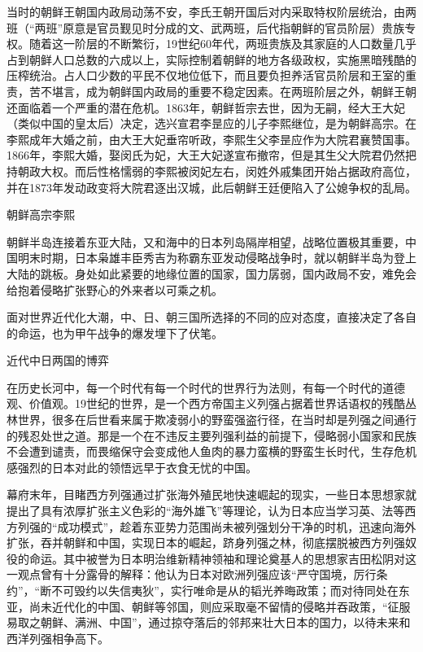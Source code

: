 \documentclass[12pt,UTF8]{ctexbook}
\begin{document}
当时的朝鲜王朝国内政局动荡不安，李氏王朝开国后对内采取特权阶层统治，由两班（“两班”原意是官员觐见时分成的文、武两班，后代指朝鲜的官员阶层）贵族专权。随着这一阶层的不断繁衍，19世纪60年代，两班贵族及其家庭的人口数量几乎占到朝鲜人口总数的六成以上，实际控制着朝鲜的地方各级政权，实施黑暗残酷的压榨统治。占人口少数的平民不仅地位低下，而且要负担养活官员阶层和王室的重责，苦不堪言，成为朝鲜国内政局的重要不稳定因素。在两班阶层之外，朝鲜王朝还面临着一个严重的潜在危机。1863年，朝鲜哲宗去世，因为无嗣，经大王大妃（类似中国的皇太后）决定，选兴宣君李昰应的儿子李熙继位，是为朝鲜高宗。在李熙成年大婚之前，由大王大妃垂帘听政，李熙生父李昰应作为大院君襄赞国事。1866年，李熙大婚，娶闵氏为妃，大王大妃遂宣布撤帘，但是其生父大院君仍然把持朝政大权。而后性格懦弱的李熙被闵妃左右，闵姓外戚集团开始占据政府高位，并在1873年发动政变将大院君逐出汉城，此后朝鲜王廷便陷入了公媳争权的乱局。


朝鲜高宗李熙

朝鲜半岛连接着东亚大陆，又和海中的日本列岛隔岸相望，战略位置极其重要，中国明末时期，日本枭雄丰臣秀吉为称霸东亚发动侵略战争时，就以朝鲜半岛为登上大陆的跳板。身处如此紧要的地缘位置的国家，国力孱弱，国内政局不安，难免会给抱着侵略扩张野心的外来者以可乘之机。

面对世界近代化大潮，中、日、朝三国所选择的不同的应对态度，直接决定了各自的命运，也为甲午战争的爆发埋下了伏笔。

近代中日两国的博弈

在历史长河中，每一个时代有每一个时代的世界行为法则，有每一个时代的道德观、价值观。19世纪的世界，是一个西方帝国主义列强占据着世界话语权的残酷丛林世界，很多在后世看来属于欺凌弱小的野蛮强盗行径，在当时却是列强之间通行的残忍处世之道。那是一个在不违反主要列强利益的前提下，侵略弱小国家和民族不会遭到谴责，而畏缩保守会变成他人鱼肉的暴力蛮横的野蛮生长时代，生存危机感强烈的日本对此的领悟远早于衣食无忧的中国。

幕府末年，目睹西方列强通过扩张海外殖民地快速崛起的现实，一些日本思想家就提出了具有浓厚扩张主义色彩的“海外雄飞”等理论，认为日本应当学习英、法等西方列强的“成功模式”，趁着东亚势力范围尚未被列强划分干净的时机，迅速向海外扩张，吞并朝鲜和中国，实现日本的崛起，跻身列强之林，彻底摆脱被西方列强奴役的命运。其中被誉为日本明治维新精神领袖和理论奠基人的思想家吉田松阴对这一观点曾有十分露骨的解释：他认为日本对欧洲列强应该“严守国境，厉行条约”，“断不可毁约以失信夷狄”，实行唯命是从的韬光养晦政策；而对待同处在东亚，尚未近代化的中国、朝鲜等邻国，则应采取毫不留情的侵略并吞政策，“征服易取之朝鲜、满洲、中国”，通过掠夺落后的邻邦来壮大日本的国力，以待未来和西洋列强相争高下。
\end{document}
